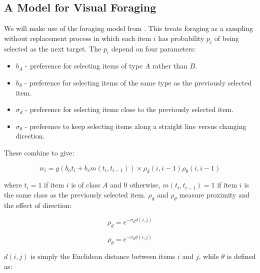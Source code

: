 \documentclass[vision,article,submit,pdftex,moreauthors]{Definitions/mdpi}
\begin{document}
\subsection{A Model for Visual Foraging}

We will make use of the foraging model from \cite{clarke2022}. This treats foraging as a sampling without replacement process in which each item $i$ has probability $p_i$ of being selected as the next target. The $p_i$ depend on four parameters:

\begin{itemize}
    \item $b_A$ - preference for selecting items of type $A$ rather than $B$.
    \item $b_S$ - preference for selecting items of the same type as the previously selected item.
    \item $\sigma_d$ - preference for selecting items close to the previously selected item.
    \item $\sigma_{\theta}$ - preference to keep selecting items along a straight line versus changing direction.
\end{itemize}

These combine to give:

\begin{linenomath}
\begin{equation}
    w_i = g\left(b_at_i + b_sm(t_i, t_{i-1})\right) \times \rho_d(i, i-1) \rho_{\theta}(i, i-1)
\end{equation}
\end{linenomath}

where $t_i = 1$ if item $i$ is of class $A$ and 0 otherwise, $m(t_i, t_{i-1}) =1$ if item $i$ is the same class as the previously selected item. $\rho_d$ and $\rho_{\theta}$ measure proximity and the effect of direction:

\begin{linenomath}
\begin{equation}
    \rho_d = e^{-\sigma_dd(i,j)}
\end{equation}
\end{linenomath}

\begin{linenomath}
\begin{equation}
    \rho_{\theta} = e^{-\sigma_d\theta(i,j)}
\end{equation}
\end{linenomath}

$d(i,j)$ is simply the Euclidean distance between items $i$ and $j$, while $\theta$ is defined as:
\end{document}

